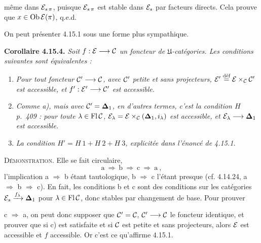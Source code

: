 même dans $\mathcal{E}_{s\,\pi}$, puisque $\mathcal{E}_{s\,\pi}$ est stable dans $\mathcal{E}_s$ par facteurs directs. Cela prouve que $x \in \operatorname{Ob} \mathcal{E}(\pi)$, q.e.d.

On peut présenter 4.15.1 sous une forme plus sympathique.

\textbf{Corollaire 4.15.4.} \textit{Soit $f : \mathcal{E} \longrightarrow \mathcal{C}$ un foncteur de $\mathfrak{U}$-catégories. Les conditions suivantes sont équivalentes :}
\begin{enumerate}
\item[\textit{a)}] \textit{Pour tout foncteur $\mathcal{C}' \longrightarrow \mathcal{C}$, avec $\mathcal{C}'$ petite et sans projecteurs, $\mathcal{E}' \overset{\text{déf}}{=} \mathcal{E} \times_{\mathcal{C}} \mathcal{C}'$ est accessible, et $f' : \mathcal{E}' \longrightarrow \mathcal{C}'$ est accessible.}
\item[\textit{b)}] \textit{Comme a), mais avec $\mathcal{C}' = \mathbf{\Delta}_1$, en d'autres termes, c'est la condition $H$ p.~409 : pour toute $\lambda \in \operatorname{Fl} \mathcal{C}$, $\mathcal{E}_{\lambda} = \mathcal{E} \times_{\mathcal{C}} (\mathbf{\Delta}_1, i_{\lambda})$ est accessible, et $\mathcal{E}_{\lambda} \longrightarrow \mathbf{\Delta}_1$ est accessible.}
\item[\textit{c)}] \textit{La condition $H' = H\ \mathit{1} + H\ \mathit{2} + H\ \mathit{3}$, explicitée dans l'énoncé de 4.15.1.}
\end{enumerate}
\textsc{Démonstration}. Elle se fait circulaire,
\[
\mathrm{a} \ \Longrightarrow \ \mathrm{b} \ \Longrightarrow \ \mathrm{c} \ \Longrightarrow \ \mathrm{a} \ ,
\]
l'implication a $\Longrightarrow$ b étant tautologique, b $\Longrightarrow$ c l'étant presque (cf. 4.14.24, a $\Longrightarrow$ b $\Longrightarrow$ c). En fait, les conditions b et c sont des conditions sur les catégories $\mathcal{E}_s \xrightarrow{f_{\lambda}} \mathbf{\Delta}_1$ pour $\lambda \in \operatorname{Fl} \mathcal{C}$, donc stables par changement de base. Pour prouver

c $\Longrightarrow$ a, on peut donc supposer que $\mathcal{C}' = \mathcal{C}$, $\mathcal{C}' \longrightarrow \mathcal{C}$ le foncteur identique, et prouver que si c) est satisfaite et si $\mathcal{C}$ est petite et sans projecteurs, alors $\mathcal{E}$ est accessible et $f$ accessible. Or c'est ce qu'affirme 4.15.1.

